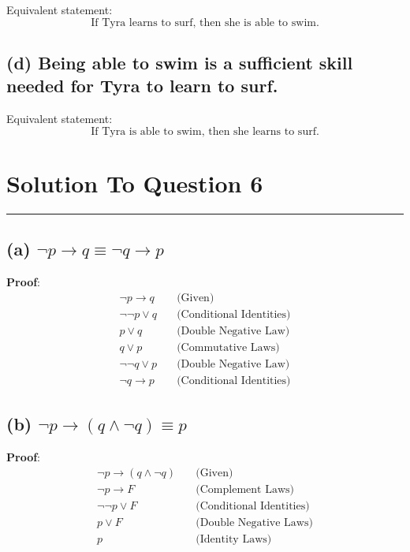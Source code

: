 \documentclass{article}
\begin{document}
Equivalent statement:
\[ \text{If Tyra learns to surf, then she is able to swim.} \]

\subsection*{(d) Being able to swim is a sufficient skill needed for Tyra to learn to surf.}

Equivalent statement:
\[ \text{If Tyra is able to swim, then she learns to surf.} \]

\newpage

\section*{Solution To Question 6}
\hrule
\subsection*{(a) $\lnot p \to q \equiv \lnot q \to p$}
\noindent\textbf{Proof}:
\begin{align*}
\lnot p \to q & \quad \text{(Given)} \\
\lnot \lnot p \lor q & \quad \text{(Conditional Identities)} \\
p \lor q & \quad \text{(Double Negative Law)}\\
q \lor p & \quad \text{(Commutative Laws)}\\
\lnot \lnot q \lor p & \quad \text{(Double Negative Law)}\\
\lnot q \to p& \quad \text{(Conditional Identities)} 
\end{align*}

\subsection*{(b) $\lnot p \to (q \land \lnot q ) \equiv p$}
\noindent\textbf{Proof}:
\begin{align*}
\lnot p \to (q \land \lnot q ) & \quad \text{(Given)}\\
\lnot p \to F & \quad \text{(Complement Laws)}\\
\lnot \lnot p \lor F & \quad \text{(Conditional Identities)}\\
p \lor F & \quad \text{(Double Negative Laws)}\\
p &\quad \text{(Identity Laws)}
\end{align*}
\end{document}
